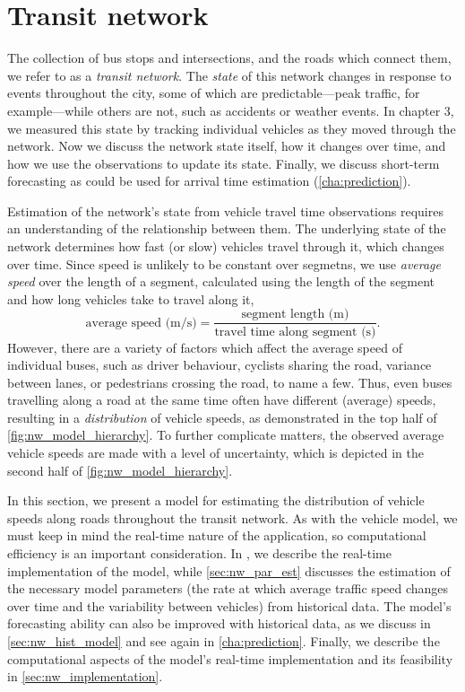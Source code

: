 \chapter{Transit network}
\label{cha:network_model}

The collection of bus stops and intersections, and the roads which connect them, we refer to as a \emph{transit network}. The \emph{state} of this network changes in response to events throughout the city, some of which are predictable---peak traffic, for example---while others are not, such as accidents or weather events. In chapter 3, we measured this state by tracking individual vehicles as they moved through the network. Now we discuss the network state itself, how it changes over time, and how we use the observations to update its state. Finally, we discuss short-term forecasting as could be used for arrival time estimation (\cref{cha:prediction}).


Estimation of the network's state from vehicle travel time observations requires an understanding of the relationship between them. The underlying state of the network determines how fast (or slow) vehicles travel through it, which changes over time. Since speed is unlikely to be constant over segmetns, we use \emph{average speed} over the length of a segment, calculated using the length of the segment and how long vehicles take to travel along it,
\begin{equation}
\label{eq:ch4:average_speed_formula}
\text{average speed (m/s)} = \frac{
\text{segment length (m)}
}{
\text{travel time along segment (s)}
}.
\end{equation}
However, there are a variety of factors which affect the average speed of individual buses, such as driver behaviour, cyclists sharing the road, variance between lanes, or pedestrians crossing the road, to name a few. Thus, even buses travelling along a road at the same time often have different (average) speeds, resulting in a \emph{distribution} of vehicle speeds, as demonstrated in the top half of \cref{fig:nw_model_hierarchy}. To further complicate matters, the observed average vehicle speeds are made with a level of uncertainty, which is depicted in the second half of \cref{fig:nw_model_hierarchy}.


In this section, we present a model for estimating the distribution of vehicle speeds along roads throughout the transit network. As with the vehicle model, we must keep in mind the real-time nature of the application, so computational efficiency is an important consideration. In , we describe the real-time implementation of the model, while \cref{sec:nw_par_est} discusses the estimation of the necessary model parameters (the rate at which average traffic speed changes over time and the variability between vehicles) from historical data. The model's forecasting ability can also be improved with historical data, as we discuss in \cref{sec:nw_hist_model} and see again in \cref{cha:prediction}. Finally, we describe the computational aspects of the model's real-time implementation and its feasibility in \cref{sec:nw_implementation}.


